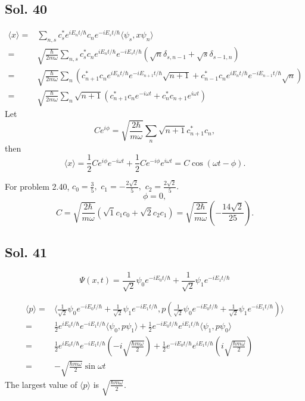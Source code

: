 \subsection*{Sol. 40}
\begin{align*}
    \langle x\rangle = &
    \sum_{n,s}c_s^*e^{iE_nt/\hbar}
    c_ne^{-iE_st/\hbar}\langle\psi_s, x\psi_n\rangle\\
    =&\sqrt{\frac{\hbar}{2m\omega}}\sum_{n,s}
    c_s^*c_ne^{iE_nt/\hbar}
    e^{-iE_st/\hbar}(\sqrt{n}\delta_{s,n-1}+\sqrt{s}\delta_{s-1,n})\\
    =&\sqrt{\frac{\hbar}{2m\omega}}\sum_n(
    c_{n+1}^*c_ne^{iE_nt/\hbar}
    e^{-iE_{n+1}t/\hbar}\sqrt{n+1}
    +c_{n-1}^*c_ne^{iE_nt/\hbar}
    e^{-iE_{n-1}t/\hbar}\sqrt{n})\\
    =&\sqrt{\frac{\hbar}{2m\omega}}\sum_n
    \sqrt{n+1}
    (c^*_{n+1}c_ne^{-i\omega t}+c^*_{n}c_{n+1}e^{i\omega t})
\end{align*}
Let $$
Ce^{i\phi} = 
\sqrt{\frac{2\hbar}{m\omega}}\sum_n
    \sqrt{n+1}
    c^*_{n+1}c_n,
$$ then 
$$
\langle x\rangle
=\frac{1}{2}Ce^{i\phi}e^{-i\omega t} + \frac{1}{2}Ce^{-i\phi} e^{i\omega t} = C\cos(\omega t-\phi).
$$

For problem 2.40, $c_0=\frac{3}{5},$ $c_1=-\frac{2\sqrt{2}}{5},$ $c_2=\frac{2\sqrt{2}}{5}.$
$$
\phi=0,
$$
$$
C = \sqrt{\frac{2\hbar}{m\omega}}
(\sqrt{1}c_1c_0+\sqrt{2}c_2c_1)
= \sqrt{\frac{2\hbar}{m\omega}}
(-\frac{14\sqrt{2}}{25}).
$$


\subsection*{Sol. 41}
$$
\Psi(x,t) = \frac{1}{\sqrt{2}}\psi_0e^{-iE_0t/\hbar}
+
\frac{1}{\sqrt{2}}\psi_1e^{-iE_1t/\hbar}
$$

\begin{align*}
    \langle p\rangle =& 
    \langle \frac{1}{\sqrt{2}}\psi_0e^{-iE_0t/\hbar}
+
\frac{1}{\sqrt{2}}\psi_1e^{-iE_1t/\hbar}, p(\frac{1}{\sqrt{2}}\psi_0e^{-iE_0t/\hbar}
+
\frac{1}{\sqrt{2}}\psi_1e^{-iE_1t/\hbar})\rangle\\
=&\frac{1}{2}e^{iE_0 t/\hbar}e^{-iE_1 t/\hbar}\langle \psi_0, p\psi_1\rangle
+\frac{1}{2}e^{-iE_0 t/\hbar}e^{iE_1 t/\hbar}\langle \psi_1, p\psi_0\rangle\\
=&
\frac{1}{2}e^{iE_0 t/\hbar}e^{-iE_1 t/\hbar}
(-i\sqrt{\frac{\hbar m\omega}{2}})
+\frac{1}{2}e^{-iE_0 t/\hbar}e^{iE_1 t/\hbar} 
(i\sqrt{\frac{\hbar m\omega}{2}})\\
=&-\sqrt{\frac{\hbar m\omega}{2}}\sin\omega t
\end{align*}
The largest value of $\langle p\rangle$ is $\sqrt{\frac{\hbar m\omega}{2}}.$


